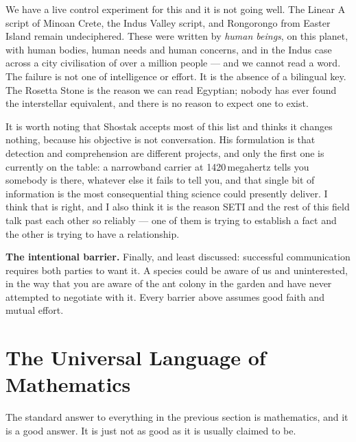 \begin{funfact}
We have a live control experiment for this and it is not going well. The Linear A script of Minoan
Crete, the Indus Valley script, and Rongorongo from Easter Island remain undeciphered. These were
written by \emph{human beings}, on this planet, with human bodies, human needs and human concerns,
and in the Indus case across a city civilisation of over a million people --- and we cannot read a
word. The failure is not one of intelligence or effort. It is the absence of a bilingual key. The
Rosetta Stone is the reason we can read Egyptian; nobody has ever found the interstellar equivalent,
and there is no reason to expect one to exist.
\end{funfact}

It is worth noting that Shostak accepts most of this list and thinks it changes nothing, because his
objective is not conversation. His formulation is that detection and comprehension are different
projects, and only the first one is currently on the table: a narrowband carrier at 1420\,megahertz
tells you somebody is there, whatever else it fails to tell you, and that single bit of information is
the most consequential thing science could presently deliver.  I think that is right, and I also think it is the reason
SETI and the rest of this field talk past each other so reliably --- one of them is trying to establish
a fact and the other is trying to have a relationship.

\textbf{The intentional barrier.} Finally, and least discussed: successful communication requires
both parties to want it. A species could be aware of us and uninterested, in the way that you are
aware of the ant colony in the garden and have never attempted to negotiate with it. Every barrier
above assumes good faith and mutual effort. 

\section{The Universal Language of Mathematics}\label{sec:mathlang}

The standard answer to everything in the previous section is mathematics, and it is a good answer.
It is just not as good as it is usually claimed to be.

